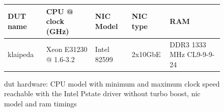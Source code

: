 \begin{figure}[!ht]
	
	\vspace{5ex}
	\begin{tabular}[]{ l | l | l | l | l }
		DUT name & CPU @ clock (GHz) & NIC Model & NIC type & RAM \\ \hline
		klaipeda & Xeon E31230 @ 1.6-3.2 & Intel 82599 & 2x10GbE & DDR3 1333 MHz CL9-9-9-24 \\
	\end{tabular}
	\caption{\Ac{dut} hardware: CPU model with minimum and maximum clock speed reachable with the Intel Pstate driver without turbo boost, \Ac{nic} model and \Ac{ram} timings}
	\label{table:hardware}
\end{figure}




